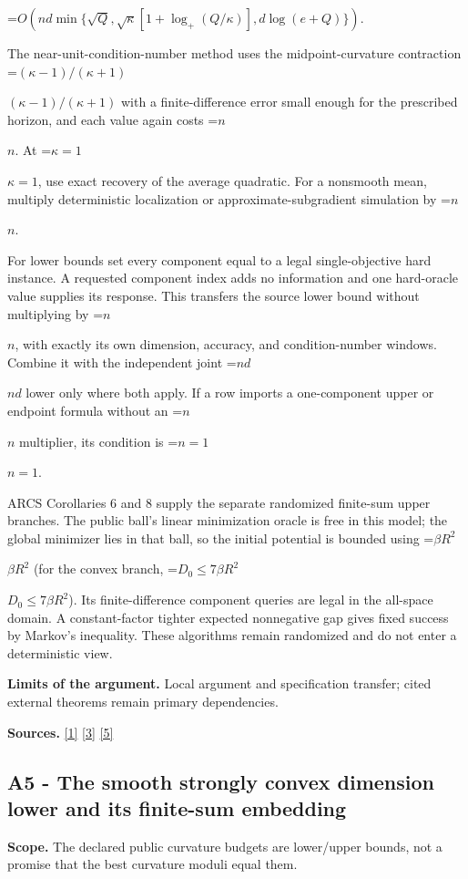 \documentclass[10pt,a4paper]{article}
\newcommand{\AtlasMath}[1]{\par\begingroup\centering\setbox0=\hbox{$\displaystyle #1$}\ifdim\wd0>1.4\linewidth\typeout{ATLAS WIDE FORMULA: \the\wd0}\fi\ifdim\wd0>\linewidth\resizebox{\linewidth}{!}{\box0}\else\box0\fi\par\endgroup}
\newcommand{\AtlasInlineMath}[1]{\begingroup\setbox0=\hbox{$#1$}\ifdim\wd0>.4\linewidth\endgroup\AtlasMath{#1}\else\endgroup$#1$\fi}
\begin{document}
\AtlasMath{O\!\left(nd\min\{\sqrt Q,\sqrt\kappa[1+\log_+(Q/\kappa)],d\log(e+Q)\}\right).}

The near-unit-condition-number method uses the midpoint-curvature contraction \AtlasInlineMath{(\kappa-1)/(\kappa+1)} with a finite-difference error small enough for the prescribed horizon, and each value again costs \AtlasInlineMath{n}. At \AtlasInlineMath{\kappa=1}, use exact recovery of the average quadratic. For a nonsmooth mean, multiply deterministic localization or approximate-subgradient simulation by \AtlasInlineMath{n}.

For lower bounds set every component equal to a legal single-objective hard instance. A requested component index adds no information and one hard-oracle value supplies its response. This transfers the source lower bound without multiplying by \AtlasInlineMath{n}, with exactly its own dimension, accuracy, and condition-number windows. Combine it with the independent joint \AtlasInlineMath{nd} lower only where both apply. If a row imports a one-component upper or endpoint formula without an \AtlasInlineMath{n} multiplier, its condition is \AtlasInlineMath{n=1}.

ARCS Corollaries 6 and 8 supply the separate randomized finite-sum upper branches. The public ball's linear minimization oracle is free in this model; the global minimizer lies in that ball, so the initial potential is bounded using \AtlasInlineMath{\beta R^2} (for the convex branch, \AtlasInlineMath{D_0\le7\beta R^2}). Its finite-difference component queries are legal in the all-space domain. A constant-factor tighter expected nonnegative gap gives fixed success by Markov's inequality. These algorithms remain randomized and do not enter a deterministic view.

\textbf{Limits of the argument.} Local argument and specification transfer; cited external theorems remain primary dependencies.

\textbf{Sources.} \href{https://arxiv.org/html/2610.00345v1}{[1]} \href{https://arxiv.org/abs/2109.08858}{[3]} \href{https://arxiv.org/html/2607.16558v2}{[5]}

\subsection{A5 - The smooth strongly convex dimension lower and its finite-sum embedding}
\textbf{Scope.} The declared public curvature budgets are lower/upper bounds, not a promise that the best curvature moduli equal them.
\end{document}
